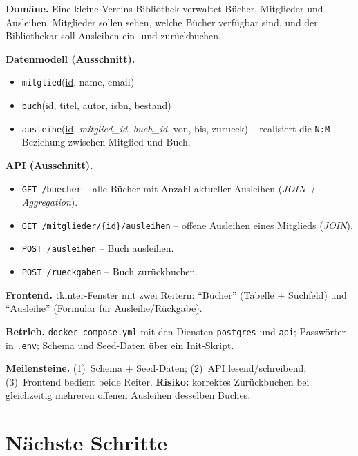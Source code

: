 \documentclass[11pt,a4paper]{article}
\begin{document}
\begin{beispielbox}
\textbf{Domäne.} Eine kleine Vereins-Bibliothek verwaltet Bücher, Mitglieder
und Ausleihen. Mitglieder sollen sehen, welche Bücher verfügbar sind, und der
Bibliothekar soll Ausleihen ein- und zurückbuchen.

\medskip
\textbf{Datenmodell (Ausschnitt).}
\begin{itemize}[leftmargin=1.4em, topsep=2pt]
  \item \texttt{mitglied}(\underline{id}, name, email)
  \item \texttt{buch}(\underline{id}, titel, autor, isbn, bestand)
  \item \texttt{ausleihe}(\underline{id}, \emph{mitglied\_id}, \emph{buch\_id},
        von, bis, zurueck) -- realisiert die \texttt{N:M}-Beziehung zwischen
        Mitglied und Buch.
\end{itemize}

\textbf{API (Ausschnitt).}
\begin{itemize}[leftmargin=1.4em, topsep=2pt]
  \item \texttt{GET /buecher} -- alle Bücher mit Anzahl aktueller Ausleihen
        (\emph{JOIN + Aggregation}).
  \item \texttt{GET /mitglieder/\{id\}/ausleihen} -- offene Ausleihen eines
        Mitglieds (\emph{JOIN}).
  \item \texttt{POST /ausleihen} -- Buch ausleihen.
  \item \texttt{POST /rueckgaben} -- Buch zurückbuchen.
\end{itemize}

\textbf{Frontend.} tkinter-Fenster mit zwei Reitern: ``Bücher'' (Tabelle +
Suchfeld) und ``Ausleihe'' (Formular für Ausleihe/Rückgabe).

\medskip
\textbf{Betrieb.} \texttt{docker-compose.yml} mit den Diensten \texttt{postgres}
und \texttt{api}; Passwörter in \texttt{.env}; Schema und Seed-Daten über ein
Init-Skript.

\medskip
\textbf{Meilensteine.} (1)~Schema + Seed-Daten; (2)~API lesend/schreibend;
(3)~Frontend bedient beide Reiter. \textbf{Risiko:} korrektes Zurückbuchen bei
gleichzeitig mehreren offenen Ausleihen desselben Buches.
\end{beispielbox}

\section{Nächste Schritte}
\end{document}
